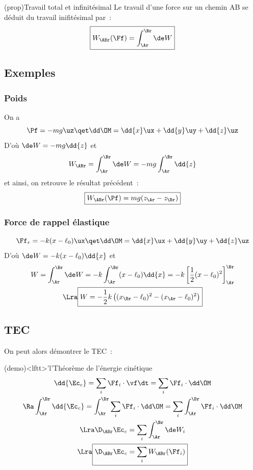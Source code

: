 \documentclass[../../main/main.tex]{subfiles}
\begin{document}
\begin{tcb*}(prop){Travail total et infinitésimal}
	Le travail d'une force sur un chemin AB se déduit du travail inifitésimal
	par~:
	\[\boxed{W_{\ABr}(\Ff) = \int_{\Ar}^{\Br} \de W}\]
\end{tcb*}

\subsection{Exemples}
\subsubsection{Poids}
On a
\[
	\Pf = -mg\uz
	\qet
	\dd\OM = \dd{x}\ux + \dd{y}\uy + \dd{z}\uz
\]
D'où $\de W = -mg\dd{z}$ et
\[W_{\ABr} = \int_{\Ar}^{\Br} \de W = -mg \int_{\Ar}^{\Br} \dd{z}\]
et ainsi, on retrouve le résultat précédent~:
\[\boxed{W_{\ABr}(\Pf) = mg(z_\Ar - z_\Br)}\]

\subsubsection{Force de rappel élastique}
\[
	\Ff_r = -k(x-\ell_0)\ux
	\qet
	\dd\OM = \dd{x}\ux + \dd{y}\uy + \dd{z}\uz
\]
D'où $\de W = -k(x-\ell_0)\dd{x}$ et
\begin{gather*}
	W
	= \int_{\Ar}^{\Br} \de W
	= -k \int_{\Ar}^{\Br} (x-\ell_0)\dd{x}
	= -k \left[ \frac{1}{2}(x-\ell_0)^2 \right]_{\Ar}^{\Br}
	\\\Lra
	\boxed{W = -\frac{1}{2}k \left( (x_\Br - \ell_0)^2 - (x_\Ar
		-\ell_0)^2\right)}
\end{gather*}

\subsection{TEC}
On peut alors démontrer le TEC~:

\begin{tcb*}(demo)<lftt>'l'{Théorème de l'énergie cinétique}
	\begin{gather*}
		\dd{\Ec_c} = \sum_i\Ff_i\cdot\vf\dt = \sum_i \Ff_i\cdot\dd\OM
		\\\Ra
		\int_{\Ar}^{\Br} \dd{\Ec_c} = \int_{\Ar}^{\Br} \sum_i \Ff_i\cdot\dd\OM
		= \sum_i \int_{\Ar}^{\Br} \Ff_i\cdot\dd\OM
		\\\Lra
		\D_{\ABr}\Ec_c = \sum_i \int_{\Ar}^{\Br} \de W_i
		\\\Lra
		\boxed{\D_{\ABr}\Ec_c = \sum_i W_{\ABr}(\Ff_i)}
	\end{gather*}
\end{tcb*}
\end{document}
